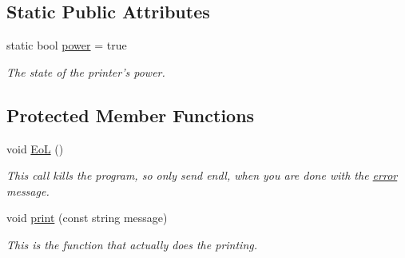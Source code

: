 \subsection*{Static Public Attributes}
\begin{DoxyCompactItemize}
\item 
static bool \hyperlink{classJKBuilder_1_1IOManager_aababa9aef0d20ddcfce2d78f41ae1dd8}{power} = true
\begin{DoxyCompactList}\small\item\em The state of the printer's power. \item\end{DoxyCompactList}\end{DoxyCompactItemize}
\subsection*{Protected Member Functions}
\begin{DoxyCompactItemize}
\item 
void \hyperlink{classJKBuilder_1_1error_a7f207ac705d33a0cd9794a9f0b4a1fa0}{EoL} ()
\begin{DoxyCompactList}\small\item\em This call kills the program, so only send endl, when you are done with the \hyperlink{classJKBuilder_1_1error}{error} message. \item\end{DoxyCompactList}\item 
void \hyperlink{classJKBuilder_1_1printer_aa32ee0a81ade611982bfc9861c5a05bb}{print} (const string message)
\begin{DoxyCompactList}\small\item\em This is the function that actually does the printing. \item\end{DoxyCompactList}\end{DoxyCompactItemize}
